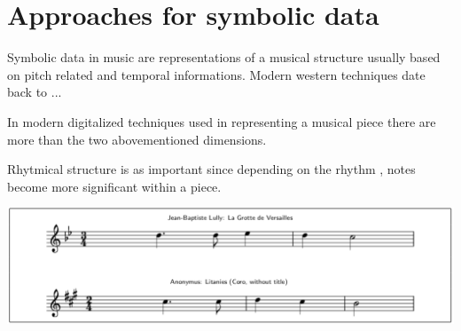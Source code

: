 \documentclass{article}
\begin{document}

	

	\section*{Approaches for symbolic data}
		Symbolic data in music are representations of a musical structure usually based on pitch related and temporal informations. Modern western techniques date back to ...

		In modern digitalized techniques used in representing a musical piece there are more than the two abovementioned dimensions. 

		Rhytmical structure is as important since depending on the rhythm  , notes become more significant within a piece.
		
		\includegraphics{figure_1_of_3}
 
\end{document}
